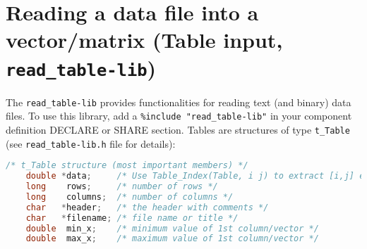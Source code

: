 \section{Reading a data file into a vector/matrix (Table input, \texttt{read\_table-lib})}
\label{s:read-table}
  The \verb+read_table-lib+ provides functionalities for reading text
  (and binary) data files. To use this library,
  add a \verb+%include "read_table-lib"+ in your component definition
  DECLARE or SHARE section. Tables are structures of type \verb+t_Table+
  (see \verb+read_table-lib.h+ file for details):
  \begin{lstlisting}[language=C]
    /* t_Table structure (most important members) */
    double *data;     /* Use Table_Index(Table, i j) to extract [i,j] element */
    long    rows;     /* number of rows */
    long    columns;  /* number of columns */
    char   *header;   /* the header with comments */
    char   *filename; /* file name or title */
    double  min_x;    /* minimum value of 1st column/vector */
    double  max_x;    /* maximum value of 1st column/vector */
\end{lstlisting}


